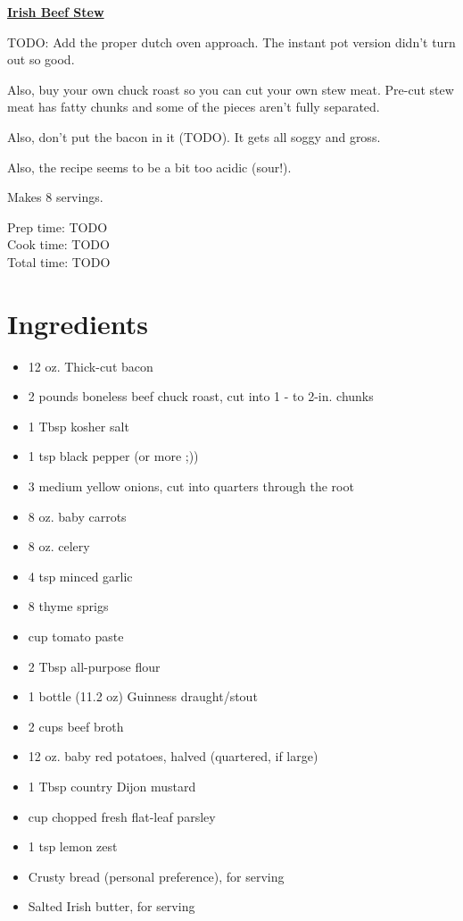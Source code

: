 \documentclass[11pt]{article}
\begin{document}
	\begin{center}\begin{huge}\underline{\textbf{Irish Beef Stew}}\end{huge}\end{center}
	
	TODO: Add the proper dutch oven approach. The instant pot version didn't turn out so good.
	
	Also, buy your own chuck roast so you can cut your own stew meat. Pre-cut stew meat has fatty chunks and some of the pieces aren't fully separated.
	
	Also, don't put the bacon in it (TODO). It gets all soggy and gross.
	
	Also, the recipe seems to be a bit too acidic (sour!).
	
	Makes 8 servings.
	
	Prep time: TODO\\
	Cook time: TODO\\
	Total time: TODO

	\section*{Ingredients}
	\begin{itemize}
		\item 12 oz. Thick-cut bacon
		\item 2  pounds boneless beef chuck roast, cut into 1 - to 2-in. chunks
		\item 1 Tbsp kosher salt
		\item 1 tsp black pepper (or more ;))
		\item 3 medium yellow onions, cut into quarters through the root
		\item 8 oz. baby carrots
		\item 8 oz. celery
		\item 4 tsp minced garlic
		\item 8 thyme sprigs
		\item {} cup tomato paste
		\item 2 Tbsp all-purpose flour
		\item 1 bottle (11.2 oz) Guinness draught/stout
		\item 2  cups beef broth
		\item 12 oz. baby red potatoes, halved (quartered, if large)
		\item 1 Tbsp country Dijon mustard
		\item {} cup chopped fresh flat-leaf parsley
		\item 1 tsp lemon zest
		\item Crusty bread (personal preference), for serving
		\item Salted Irish butter, for serving
	\end{itemize}
	
\end{document}
